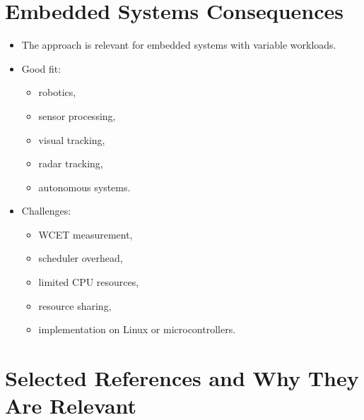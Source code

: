 \documentclass[a4paper,11pt]{article}
\begin{document}
\section*{Embedded Systems Consequences}

\begin{itemize}
    \item The approach is relevant for embedded systems with variable workloads.
    \item Good fit:
    \begin{itemize}
        \item robotics,
        \item sensor processing,
        \item visual tracking,
        \item radar tracking,
        \item autonomous systems.
    \end{itemize}
    \item Challenges:
    \begin{itemize}
        \item WCET measurement,
        \item scheduler overhead,
        \item limited CPU resources,
        \item resource sharing,
        \item implementation on Linux or microcontrollers.
    \end{itemize}
\end{itemize}

\section*{Selected References and Why They Are Relevant}
\end{document}

